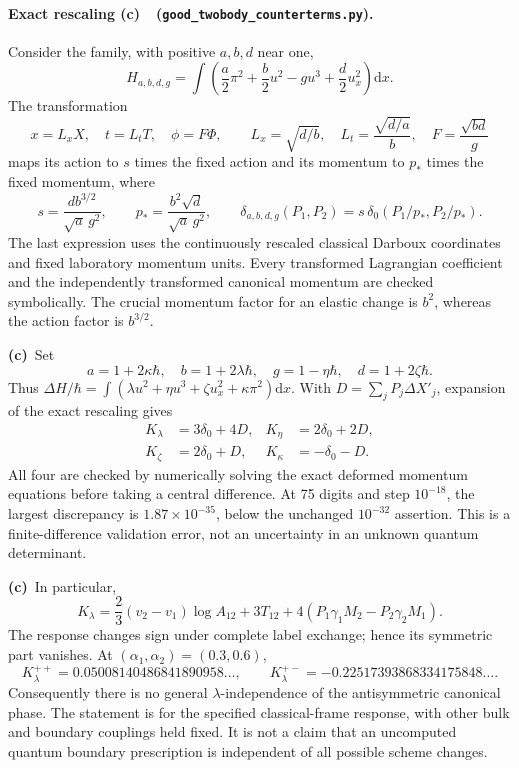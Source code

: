 \documentclass[11pt,a4paper]{article}
\newcommand{\Cc}{\textbf{(c)}\ }
\newcommand{\dd}{\mathrm d}
\newcommand{\file}[1]{\nolinkurl{#1}}
\newcommand{\ct}{\file{good_twobody_counterterms.py}}
\begin{document}
\paragraph{Exact rescaling \Cc\ (\ct).}
Consider the family, with positive \(a,b,d\) near one,
\begin{equation}
 H_{a,b,d,g}=\int\left(\frac a2\pi^2+\frac b2u^2-gu^3+
                               \frac d2u_x^2\right)\dd x.
\end{equation}
The transformation
\begin{equation}
 x=L_xX,\quad t=L_tT,\quad \phi=F\Phi,\qquad
 L_x=\sqrt{d/b},\quad L_t=\frac{\sqrt{d/a}}b,\quad F=\frac{\sqrt{bd}}g
 \label{eq:scaling}
\end{equation}
maps its action to \(s\) times the fixed action and its momentum to
\(p_*\) times the fixed momentum, where
\begin{equation}
 s=\frac{db^{3/2}}{\sqrt a\,g^2},\qquad
 p_*=\frac{b^2\sqrt d}{\sqrt a\,g^2},\qquad
 \delta_{a,b,d,g}(P_1,P_2)
 =s\,\delta_0(P_1/p_*,P_2/p_*).
 \label{eq:scaledphase}
\end{equation}
The last expression uses the continuously rescaled classical Darboux
coordinates and fixed laboratory momentum units. Every transformed
Lagrangian coefficient and the independently transformed canonical
momentum are checked symbolically. The crucial momentum factor for an
elastic change is \(b^2\), whereas the action factor is \(b^{3/2}\).

\Cc Set
\[
 a=1+2\kappa\hbar,\quad b=1+2\lambda\hbar,\quad
 g=1-\eta\hbar,\quad d=1+2\zeta\hbar.
\]
Thus \(\Delta H/\hbar=\int(\lambda u^2+\eta u^3+
\zeta u_x^2+\kappa\pi^2)\dd x\). With
\(D=\sum_jP_j\Delta X'_j\), expansion of the exact rescaling gives
\begin{align}
 K_\lambda&=3\delta_0+4D,& K_\eta&=2\delta_0+2D,\\
 K_\zeta&=2\delta_0+D,& K_\kappa&=-\delta_0-D.
 \label{eq:responses}
\end{align}
All four are checked by numerically solving the exact deformed momentum
equations before taking a central difference. At 75 digits and step
\(10^{-18}\), the largest discrepancy is \(1.87\times10^{-35}\),
below the unchanged \(10^{-32}\) assertion. This is a finite-difference
validation error, not an uncertainty in an unknown quantum determinant.

\Cc In particular,
\begin{equation}
 \boxed{K_\lambda=\frac23(v_2-v_1)\log A_{12}
       +3T_{12}+4(P_1\gamma_1M_2-P_2\gamma_2M_1).}
 \label{eq:lambda}
\end{equation}
The response changes sign under complete label exchange; hence its
symmetric part vanishes. At \((\alpha_1,\alpha_2)=(0.3,0.6)\),
\[
 K_\lambda^{++}=0.05008140486841890958\ldots,\qquad
 K_\lambda^{+-}=-0.22517393868334175848\ldots.
\]
Consequently there is no general \(\lambda\)-independence of the
antisymmetric canonical phase. The statement is for the specified
classical-frame response, with other bulk and boundary couplings held
fixed. It is not a claim that an uncomputed quantum boundary prescription
is independent of all possible scheme changes.
\end{document}
